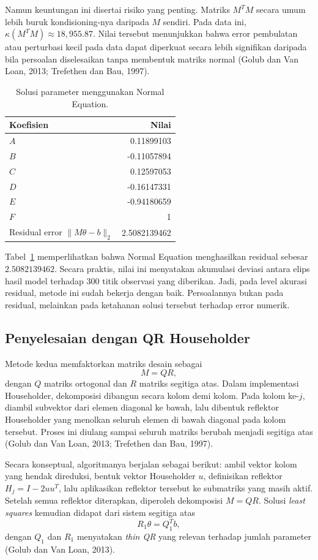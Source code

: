 \documentclass[12pt,a4paper]{article}
\begin{document}
Namun keuntungan ini disertai risiko yang penting. Matriks \(M^TM\) secara umum lebih buruk kondisioning-nya daripada \(M\) sendiri. Pada data ini, \(\kappa(M^TM)\approx 18{,}955.87\). Nilai tersebut menunjukkan bahwa error pembulatan atau perturbasi kecil pada data dapat diperkuat secara lebih signifikan daripada bila persoalan diselesaikan tanpa membentuk matriks normal (Golub dan Van Loan, 2013; Trefethen dan Bau, 1997).

\begin{table}[h]
\centering
\caption{Solusi parameter menggunakan Normal Equation.}
\label{tab:star-normal-solution}
\begin{tabular}{lr}
\toprule
Koefisien & Nilai \\
\midrule
$A$ & 0.11899103 \\
$B$ & -0.11057894 \\
$C$ & 0.12597053 \\
$D$ & -0.16147331 \\
$E$ & -0.94180659 \\
$F$ & 1 \\
\midrule
Residual error $\|M\theta-b\|_2$ & 2.5082139462 \\
\bottomrule
\end{tabular}
\end{table}

Tabel~\ref{tab:star-normal-solution} memperlihatkan bahwa Normal Equation menghasilkan residual sebesar \(2.5082139462\). Secara praktis, nilai ini menyatakan akumulasi deviasi antara elips hasil model terhadap 300 titik observasi yang diberikan. Jadi, pada level akurasi residual, metode ini sudah bekerja dengan baik. Persoalannya bukan pada residual, melainkan pada ketahanan solusi tersebut terhadap error numerik.

\subsection{Penyelesaian dengan QR Householder}
Metode kedua memfaktorkan matriks desain sebagai
\[
M = QR,
\]
dengan \(Q\) matriks ortogonal dan \(R\) matriks segitiga atas. Dalam implementasi Householder, dekomposisi dibangun secara kolom demi kolom. Pada kolom ke-\(j\), diambil subvektor dari elemen diagonal ke bawah, lalu dibentuk reflektor Householder yang menolkan seluruh elemen di bawah diagonal pada kolom tersebut. Proses ini diulang sampai seluruh matriks berubah menjadi segitiga atas (Golub dan Van Loan, 2013; Trefethen dan Bau, 1997).

Secara konseptual, algoritmanya berjalan sebagai berikut: ambil vektor kolom yang hendak direduksi, bentuk vektor Householder \(u\), definisikan reflektor \(H_j = I - 2uu^T\), lalu aplikasikan reflektor tersebut ke submatriks yang masih aktif. Setelah semua reflektor diterapkan, diperoleh dekomposisi \(M=QR\). Solusi \emph{least squares} kemudian didapat dari sistem segitiga atas
\[
R_1\theta = Q_1^Tb,
\]
dengan \(Q_1\) dan \(R_1\) menyatakan \emph{thin QR} yang relevan terhadap jumlah parameter (Golub dan Van Loan, 2013).
\end{document}
